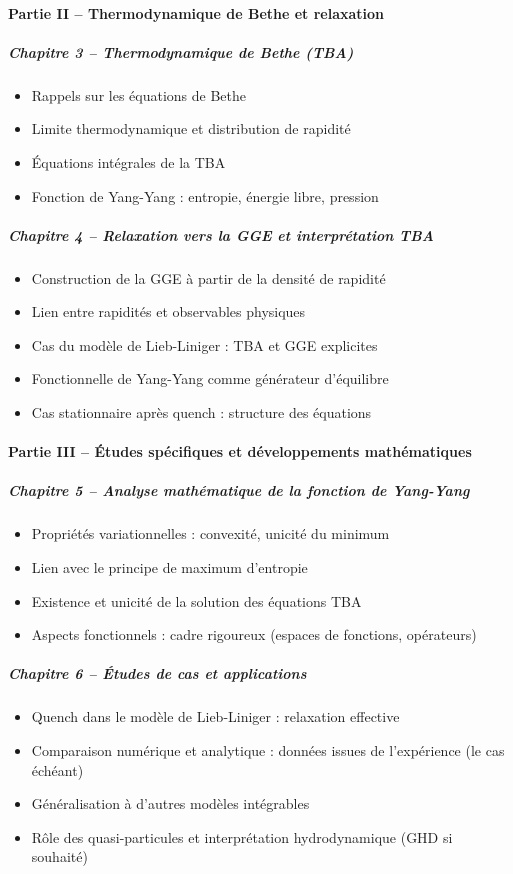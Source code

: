\paragraph{Partie II – Thermodynamique de Bethe et relaxation}

\subparagraph{Chapitre 3 – Thermodynamique de Bethe (TBA)}
\begin{itemize}
    \item Rappels sur les équations de Bethe
    \item Limite thermodynamique et distribution de rapidité
    \item Équations intégrales de la TBA
    \item Fonction de Yang-Yang : entropie, énergie libre, pression
\end{itemize}

\subparagraph{Chapitre 4 – Relaxation vers la GGE et interprétation TBA}
\begin{itemize}
    \item Construction de la GGE à partir de la densité de rapidité
    \item Lien entre rapidités et observables physiques
    \item Cas du modèle de Lieb-Liniger : TBA et GGE explicites
    \item Fonctionnelle de Yang-Yang comme générateur d’équilibre
    \item Cas stationnaire après quench : structure des équations
\end{itemize}

\paragraph{Partie III – Études spécifiques et développements mathématiques}

\subparagraph{Chapitre 5 – Analyse mathématique de la fonction de Yang-Yang}
\begin{itemize}
    \item Propriétés variationnelles : convexité, unicité du minimum
    \item Lien avec le principe de maximum d’entropie
    \item Existence et unicité de la solution des équations TBA
    \item Aspects fonctionnels : cadre rigoureux (espaces de fonctions, opérateurs)
\end{itemize}

\subparagraph{Chapitre 6 – Études de cas et applications}
\begin{itemize}
    \item Quench dans le modèle de Lieb-Liniger : relaxation effective
    \item Comparaison numérique et analytique : données issues de l’expérience (le cas échéant)
    \item Généralisation à d’autres modèles intégrables
    \item Rôle des quasi-particules et interprétation hydrodynamique (GHD si souhaité)
\end{itemize}

